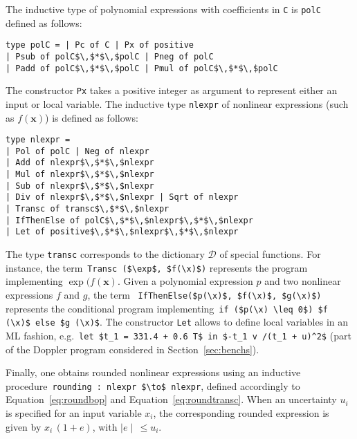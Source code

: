 \documentclass[preprint]{sigplanconf}
\newcommand{\code}[1]{\lstinline{#1}}
\newcommand{\setD}{\mathcal{D}} %
\newcommand{\x}{\mathbf{x}}
\theoremstyle{plain}
\begin{document}
The inductive type of polynomial expressions with coefficients in \code{C} is \code{polC} defined as follows:
\begin{lstlisting}
type polC = | Pc of C | Px of positive 
| Psub of polC$\,$*$\,$polC | Pneg of polC 
| Padd of polC$\,$*$\,$polC | Pmul of polC$\,$*$\,$polC
\end{lstlisting}
%
The constructor \code{Px} takes a positive integer as argument to represent either an input or local variable.
The inductive type \code{nlexpr} of nonlinear expressions (such as $f(\x)$) is defined as follows:
\begin{lstlisting}
type nlexpr = 
| Pol of polC | Neg of nlexpr
| Add of nlexpr$\,$*$\,$nlexpr 
| Mul of nlexpr$\,$*$\,$nlexpr 
| Sub of nlexpr$\,$*$\,$nlexpr 
| Div of nlexpr$\,$*$\,$nlexpr | Sqrt of nlexpr 
| Transc of transc$\,$*$\,$nlexpr
| IfThenElse of polC$\,$*$\,$nlexpr$\,$*$\,$nlexpr
| Let of positive$\,$*$\,$nlexpr$\,$*$\,$nlexpr
\end{lstlisting}
%
The type \code{transc} corresponds to the dictionary $\setD$ of special functions. For instance, the term~\lstinline|Transc ($\exp$, $f(\x)$)| represents the program implementing $\exp(f(\x)$.
Given a polynomial expression $p$ and two nonlinear expressions $f$ and $g$, the term ~\lstinline|IfThenElse($p(\x)$, $f(\x)$, $g(\x)$)| represents the conditional program implementing~\lstinline|if ($p(\x) \leq 0$) $f (\x)$ else $g (\x)$|. The constructor \code{Let} allows to define local variables in an ML fashion, e.g.~\lstinline|let $t_1 = 331.4 + 0.6 T$ in $-t_1 v /(t_1 + u)^2$| (part of the Doppler program considered in Section~\ref{sec:benchs}).
%
%

Finally, one obtains rounded nonlinear expressions using an inductive procedure~\lstinline|rounding : nlexpr $\to$ nlexpr|, defined accordingly to Equation~\eqref{eq:roundbop} and Equation~\eqref{eq:roundtransc}. When an uncertainty $u_i$ is specified for an input variable $x_i$, the corresponding rounded expression is given by $x_i \, (1 + e)$, with $\mid e \mid \, \leq u_i$.

\end{document}
